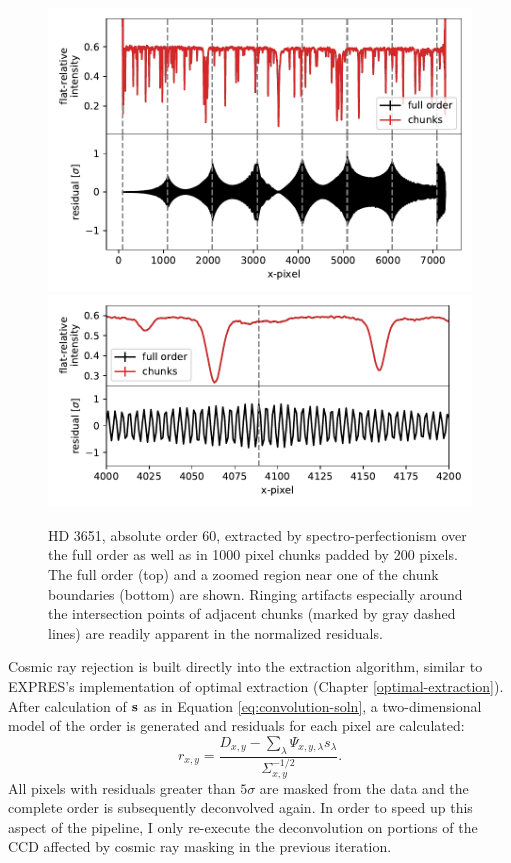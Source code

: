 \begin{figure}
    \centering
    \includegraphics[width=\textwidth]{figures-5/spec-perf-ringing-1.pdf}
    \includegraphics[width=\textwidth]{figures-5/spec-perf-ringing-2.pdf}
    \caption{HD 3651, absolute order 60, extracted by spectro-perfectionism over the full order as well as in 1000 pixel chunks padded by 200 pixels. The full order (top) and a zoomed region near one of the chunk boundaries (bottom) are shown. Ringing artifacts especially around the intersection points of adjacent chunks (marked by gray dashed lines) are readily apparent in the normalized residuals.}
    \label{fig:spec-perf-ringing}
\end{figure}

Cosmic ray rejection is built directly into the extraction algorithm, similar to EXPRES's implementation of optimal extraction (Chapter \ref{optimal-extraction}). After calculation of $\vb{s}$ as in Equation \ref{eq:convolution-soln}, a two-dimensional model of the order is generated and residuals for each pixel are calculated:
\begin{equation}
    r_{x,y} = \frac{D_{x,y} - \sum_\lambda{\Psi_{x,y,\lambda}s_\lambda}} {\Sigma_{x,y}^{-1/2}}.
    \label{eq:spec-perf-resid}
\end{equation}
All pixels with residuals greater than $5\sigma$ are masked from the data and the complete order is subsequently deconvolved again. In order to speed up this aspect of the pipeline, I only re-execute the deconvolution on portions of the CCD affected by cosmic ray masking in the previous iteration.

